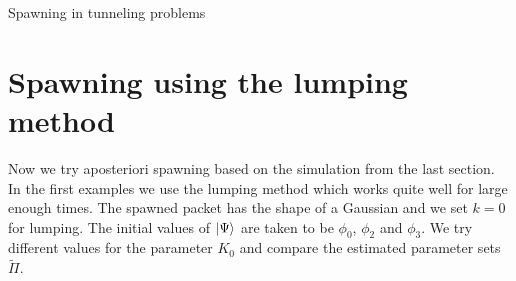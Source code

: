 \begin{chapter}{Spawning in tunneling problems}
\FloatBarrier
\section{Spawning using the lumping method}

Now we try aposteriori spawning based on the simulation from the last section.
In the first examples we use the lumping method which works quite well for large
enough times. The spawned packet has the shape of a Gaussian and we set $k=0$ for
lumping. The initial values of $\Ket{\Psi}$ are taken to be $\phi_0$, $\phi_2$
and $\phi_3$. We try different values for the parameter $K_0$ and compare the
estimated parameter sets $\tilde{\Pi}$.


\begin{figure}[h!]
  \centering
   \\
\end{figure}
\end{chapter}
